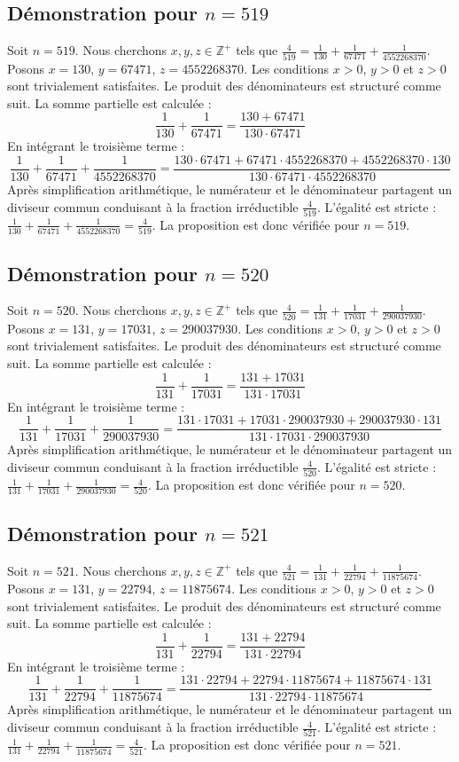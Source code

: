 \documentclass[11pt,a4paper]{article}
\begin{document}
\subsection{Démonstration pour $n = 519$}
Soit $n = 519$. Nous cherchons $x, y, z \in \mathbb{Z}^{+}$ tels que $\frac{4}{519} = \frac{1}{130} + \frac{1}{67471} + \frac{1}{4552268370}$.
Posons $x = 130$, $y = 67471$, $z = 4552268370$.
Les conditions $x > 0$, $y > 0$ et $z > 0$ sont trivialement satisfaites.
Le produit des dénominateurs est structuré comme suit. La somme partielle est calculée :
$$ \frac{1}{130} + \frac{1}{67471} = \frac{130+67471}{130 \cdot 67471} $$
En intégrant le troisième terme :
$$ \frac{1}{130} + \frac{1}{67471} + \frac{1}{4552268370} = \frac{130 \cdot 67471 + 67471 \cdot 4552268370 + 4552268370 \cdot 130}{130 \cdot 67471 \cdot 4552268370} $$
Après simplification arithmétique, le numérateur et le dénominateur partagent un diviseur commun conduisant à la fraction irréductible $\frac{4}{519}$.
L'égalité est stricte : $\frac{1}{130} + \frac{1}{67471} + \frac{1}{4552268370} = \frac{4}{519}$.
La proposition est donc vérifiée pour $n = 519$.
\subsection{Démonstration pour $n = 520$}
Soit $n = 520$. Nous cherchons $x, y, z \in \mathbb{Z}^{+}$ tels que $\frac{4}{520} = \frac{1}{131} + \frac{1}{17031} + \frac{1}{290037930}$.
Posons $x = 131$, $y = 17031$, $z = 290037930$.
Les conditions $x > 0$, $y > 0$ et $z > 0$ sont trivialement satisfaites.
Le produit des dénominateurs est structuré comme suit. La somme partielle est calculée :
$$ \frac{1}{131} + \frac{1}{17031} = \frac{131+17031}{131 \cdot 17031} $$
En intégrant le troisième terme :
$$ \frac{1}{131} + \frac{1}{17031} + \frac{1}{290037930} = \frac{131 \cdot 17031 + 17031 \cdot 290037930 + 290037930 \cdot 131}{131 \cdot 17031 \cdot 290037930} $$
Après simplification arithmétique, le numérateur et le dénominateur partagent un diviseur commun conduisant à la fraction irréductible $\frac{4}{520}$.
L'égalité est stricte : $\frac{1}{131} + \frac{1}{17031} + \frac{1}{290037930} = \frac{4}{520}$.
La proposition est donc vérifiée pour $n = 520$.
\subsection{Démonstration pour $n = 521$}
Soit $n = 521$. Nous cherchons $x, y, z \in \mathbb{Z}^{+}$ tels que $\frac{4}{521} = \frac{1}{131} + \frac{1}{22794} + \frac{1}{11875674}$.
Posons $x = 131$, $y = 22794$, $z = 11875674$.
Les conditions $x > 0$, $y > 0$ et $z > 0$ sont trivialement satisfaites.
Le produit des dénominateurs est structuré comme suit. La somme partielle est calculée :
$$ \frac{1}{131} + \frac{1}{22794} = \frac{131+22794}{131 \cdot 22794} $$
En intégrant le troisième terme :
$$ \frac{1}{131} + \frac{1}{22794} + \frac{1}{11875674} = \frac{131 \cdot 22794 + 22794 \cdot 11875674 + 11875674 \cdot 131}{131 \cdot 22794 \cdot 11875674} $$
Après simplification arithmétique, le numérateur et le dénominateur partagent un diviseur commun conduisant à la fraction irréductible $\frac{4}{521}$.
L'égalité est stricte : $\frac{1}{131} + \frac{1}{22794} + \frac{1}{11875674} = \frac{4}{521}$.
La proposition est donc vérifiée pour $n = 521$.
\end{document}
